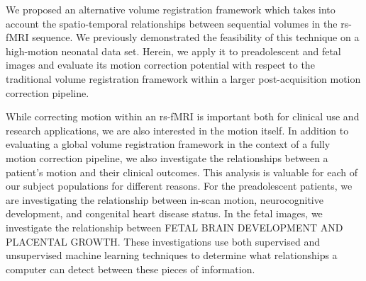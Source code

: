 We proposed an alternative volume registration framework which takes into account the spatio-temporal relationships between sequential volumes in the rs-fMRI sequence. We previously demonstrated the feasibility of this technique on a high-motion neonatal data set. Herein, we apply it to preadolescent and fetal images and evaluate its motion correction potential with respect to the traditional volume registration framework within a larger post-acquisition motion correction pipeline. 

While correcting motion within an rs-fMRI is important both for clinical use and research applications, we are also interested in the motion itself. In addition to evaluating a global volume registration framework in the context of a fully motion correction pipeline, we also investigate the relationships between a patient's motion and their clinical outcomes. This analysis is valuable for each of our subject populations for different reasons. For the preadolescent patients, we are investigating the relationship between in-scan motion, neurocognitive development, and congenital heart disease status. In the fetal images, we investigate the relationship between FETAL BRAIN DEVELOPMENT AND PLACENTAL GROWTH. %
These investigations use both supervised and unsupervised machine learning techniques to determine what relationships a computer can detect between these pieces of information.

